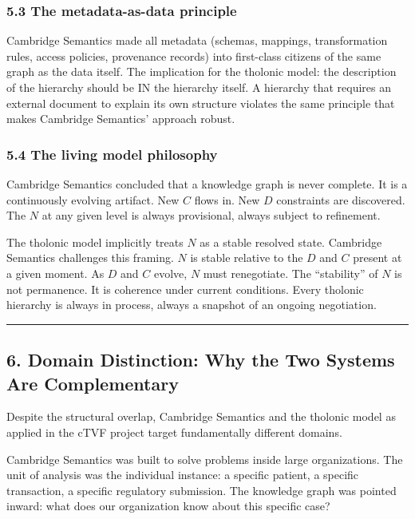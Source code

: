 \documentclass[
  11pt,
  letterpaper,
]{article}
\begin{document}
\subsubsection{5.3 The metadata-as-data
principle}\label{the-metadata-as-data-principle}

Cambridge Semantics made all metadata (schemas, mappings, transformation
rules, access policies, provenance records) into first-class citizens of
the same graph as the data itself. The implication for the tholonic
model: the description of the hierarchy should be IN the hierarchy
itself. A hierarchy that requires an external document to explain its
own structure violates the same principle that makes Cambridge
Semantics' approach robust.

\subsubsection{5.4 The living model
philosophy}\label{the-living-model-philosophy}

Cambridge Semantics concluded that a knowledge graph is never complete.
It is a continuously evolving artifact. New \(C\) flows in. New \(D\)
constraints are discovered. The \(N\) at any given level is always
provisional, always subject to refinement.

The tholonic model implicitly treats \(N\) as a stable resolved state.
Cambridge Semantics challenges this framing. \(N\) is stable relative to
the \(D\) and \(C\) present at a given moment. As \(D\) and \(C\)
evolve, \(N\) must renegotiate. The ``stability'' of \(N\) is not
permanence. It is coherence under current conditions. Every tholonic
hierarchy is always in process, always a snapshot of an ongoing
negotiation.

\begin{center}\rule{0.5\linewidth}{0.5pt}\end{center}

\subsection{6. Domain Distinction: Why the Two Systems Are
Complementary}\label{domain-distinction-why-the-two-systems-are-complementary}

Despite the structural overlap, Cambridge Semantics and the tholonic
model as applied in the cTVF project target fundamentally different
domains.

Cambridge Semantics was built to solve problems inside large
organizations. The unit of analysis was the individual instance: a
specific patient, a specific transaction, a specific regulatory
submission. The knowledge graph was pointed inward: what does our
organization know about this specific case?
\end{document}

